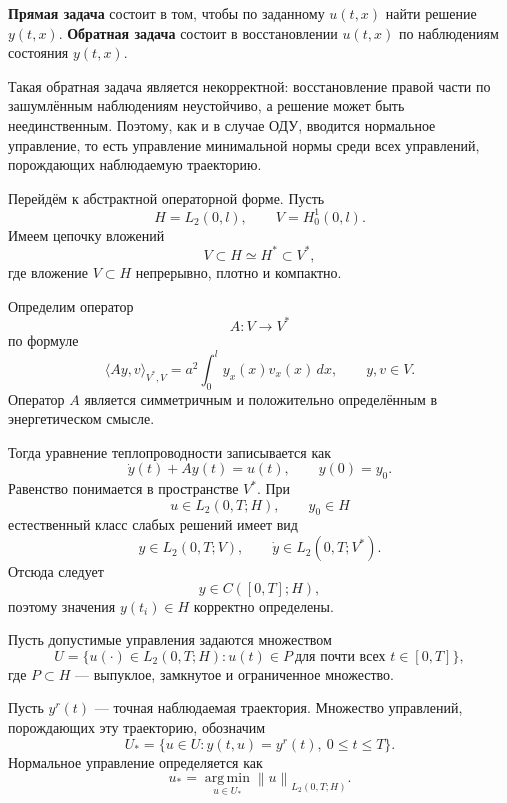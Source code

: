 \documentclass[12pt,a4paper]{article}
\newcommand{\dd}{\,d}
\newcommand{\norm}[1]{\left\lVert #1\right\rVert}
\begin{document}
\textbf{Прямая задача} состоит в том, чтобы по заданному $u(t,x)$ найти решение $y(t,x)$. \textbf{Обратная задача} состоит в восстановлении $u(t,x)$ по наблюдениям состояния $y(t,x)$.

Такая обратная задача является некорректной: восстановление правой части по зашумлённым наблюдениям неустойчиво, а решение может быть неединственным. Поэтому, как и в случае ОДУ, вводится нормальное управление, то есть управление минимальной нормы среди всех управлений, порождающих наблюдаемую траекторию.

Перейдём к абстрактной операторной форме. Пусть
\[
    H=L_2(0,l),\qquad V=H_0^1(0,l).
\]
Имеем цепочку вложений
\begin{equation}
    V\subset H\simeq H^*\subset V^*,
\end{equation}
где вложение $V\subset H$ непрерывно, плотно и компактно.

Определим оператор
\[
    A:V\to V^*
\]
по формуле
\begin{equation}
    \langle Ay,v\rangle_{V^*,V}
    =a^2\int_0^l y_x(x)v_x(x)\dd x,
    \qquad y,v\in V.
\end{equation}
Оператор $A$ является симметричным и положительно определённым в энергетическом смысле.

Тогда уравнение теплопроводности записывается как
\begin{equation}
    \dot y(t)+Ay(t)=u(t),\qquad y(0)=y_0.
\end{equation}
Равенство понимается в пространстве $V^*$. При
\[
    u\in L_2(0,T;H),\qquad y_0\in H
\]
естественный класс слабых решений имеет вид
\begin{equation}
    y\in L_2(0,T;V),\qquad \dot y\in L_2(0,T;V^*).
\end{equation}
Отсюда следует
\begin{equation}
    y\in C([0,T];H),
\end{equation}
поэтому значения $y(t_i)\in H$ корректно определены.

Пусть допустимые управления задаются множеством
\begin{equation}
    U=\{u(\cdot)\in L_2(0,T;H): u(t)\in P\ \text{для почти всех }t\in[0,T]\},
\end{equation}
где $P\subset H$ --- выпуклое, замкнутое и ограниченное множество.

Пусть $y^r(t)$ --- точная наблюдаемая траектория. Множество управлений, порождающих эту траекторию, обозначим
\begin{equation}
    U_* = \{u\in U:y(t,u)=y^r(t),\ 0\le t\le T\}.
\end{equation}
Нормальное управление определяется как
\begin{equation}
    u_* = \operatorname*{arg\,min}_{u\in U_*}\norm{u}_{L_2(0,T;H)}.
\end{equation}
\end{document}
